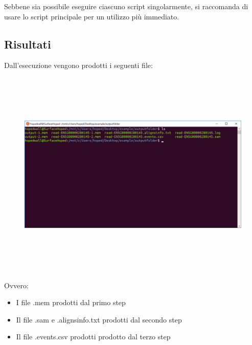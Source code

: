 Sebbene sia possibile eseguire ciascuno script singolarmente, si raccomanda di usare lo script principale per un utilizzo più immediato. 

\newpage

\subsection{Risultati}

Dall'esecuzione vengono prodotti i seguenti file:

\begin{figure}[h!]
	\centering
	\includegraphics[width=\linewidth,height=10cm]{images/fileprodotti.png}
  \label{fig:ProducedFiles}
\end{figure}

Ovvero:

\begin{itemize}
	\item I file .mem prodotti dal primo step
	\item Il file .sam e .alignsinfo.txt prodotti dal secondo step
	\item	Il file .events.csv prodotti prodotto dal terzo step
\end{itemize}

%
%

